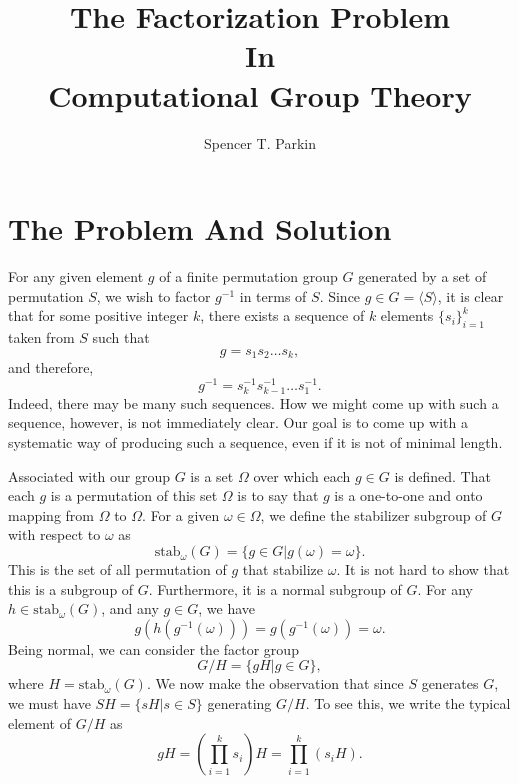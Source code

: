 \documentclass[12pt]{article}
\title{The Factorization Problem\\In\\Computational Group Theory}
\author{Spencer T. Parkin}
\newcommand{\stab}{\mbox{stab}}
\begin{document}
\maketitle

\section*{The Problem And Solution}

For any given element $g$ of a finite permutation group $G$ generated
by a set of permutation $S$, we wish to factor $g^{-1}$ in terms of $S$.
Since $g\in G=\langle S\rangle$, it is clear that for some positive integer $k$, there exists
a sequence of $k$ elements $\{s_i\}_{i=1}^k$ taken from $S$ such that
\begin{equation*}
g = s_1s_2\dots s_k,
\end{equation*}
and therefore,
\begin{equation*}
g^{-1} = s_k^{-1}s_{k-1}^{-1}\dots s_1^{-1}.
\end{equation*}
Indeed, there may be many such sequences.
How we might come up with such a sequence, however, is not immediately clear.
Our goal is to come up with a systematic way of producing such a sequence, even if it
is not of minimal length.

Associated with our group $G$ is a set $\Omega$ over which each $g\in G$ is defined.
That each $g$ is a permutation of this set $\Omega$ is to say that $g$ is a one-to-one and onto
mapping from $\Omega$ to $\Omega$.
For a given $\omega\in\Omega$,
we define the stabilizer subgroup of $G$ with respect to $\omega$ as
\begin{equation*}
\stab_{\omega}(G) = \{g\in G|g(\omega)=\omega\}.
\end{equation*}
This is the set of all permutation of $g$ that stabilize $\omega$.  It is not hard to show
that this is a subgroup of $G$.  Furthermore, it is a normal subgroup of $G$.  For any $h\in\stab_{\omega}(G)$,
and any $g\in G$, we have
\begin{equation*}
g(h(g^{-1}(\omega))) = g(g^{-1}(\omega)) = \omega.
\end{equation*}
Being normal, we can consider the factor group
\begin{equation*}
G/H = \{gH|g\in G\},
\end{equation*}
where $H=\stab_{\omega}(G)$.  We now make the observation that since $S$
generates $G$, we must have $SH=\{sH|s\in S\}$ generating $G/H$.  To see this, we write
the typical element of $G/H$ as
\begin{equation*}
gH = \left(\prod_{i=1}^k s_i\right)H = \prod_{i=1}^k (s_iH).
\end{equation*}
\end{document}
